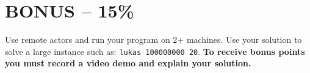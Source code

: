 \documentclass{article}
\begin{document}
\section{BONUS – 15\%}
Use remote actors and run your program on 2+ machines. 
Use your solution to solve a large instance such as: \texttt{lukas 100000000 20}.
\textbf{To receive bonus points you must record a video demo and explain your solution.}
\end{document}
